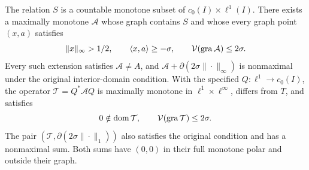 \renewcommand{\thetheorem}{N}
\begin{theorem}
\label{thm:nonconstructive}
The relation $S$ is a countable monotone subset of
$c_0(I)\times\ell^1(I)$. There exists a maximally monotone
$\mathcal A$ whose graph contains $S$ and whose every graph point $(x,a)$ satisfies
\[
\|x\|_\infty>1/2,\qquad \langle x,a\rangle\ge-\sigma,
\qquad \mathcal V(\operatorname{gra}\mathcal A)\le2\sigma.
\]
Every such extension satisfies $\mathcal A\ne A$, and
$\mathcal A+\partial(2\sigma\|\cdot\|_\infty)$ is nonmaximal under
the original interior-domain condition.
With the specified $Q:\ell^1\to c_0(I)$, the operator
$\mathcal T=Q^*\mathcal A Q$ is maximally monotone in
$\ell^1\times\ell^\infty$, differs from $T$, and satisfies
\[
0\notin\operatorname{dom}\mathcal T,\qquad
\mathcal V(\operatorname{gra}\mathcal T)\le2\sigma.
\]
The pair $(\mathcal T,\partial(2\sigma\|\cdot\|_1))$ also satisfies
the original condition and has a nonmaximal sum. Both sums have
$(0,0)$ in their full monotone polar and outside their graph.
\end{theorem}
